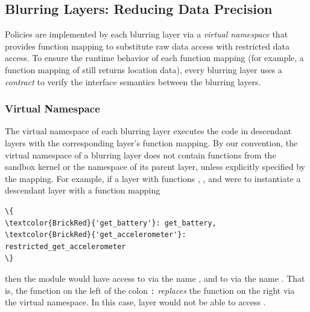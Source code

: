 
\subsection{Blurring Layers: Reducing Data Precision}\label{sec-layer}



Policies are implemented by each blurring layer via a \textit{virtual 
namespace} that provides function mapping to substitute raw 
data access with restricted data access. 
To ensure the runtime behavior of each function mapping (for example, 
a function mapping of  still returns location data), 
every blurring layer uses a \textit{contract} to verify the interface 
semantics between the blurring layers.

\subsubsection{Virtual Namespace}

The virtual namespace of each blurring layer executes the code in descendant 
layers with the corresponding layer's function mapping. By our convention, 
the virtual namespace of a blurring layer does not contain functions from the 
sandbox kernel or the namespace of its parent layer, unless explicitly 
specified by the mapping. 
For example, if a layer  with 
functions , , and 
 were to instantiate a descendant 
layer  with a function mapping 

\begin{Verbatim}
\{
\textcolor{BrickRed}{'get_battery'}: get_battery, 
\textcolor{BrickRed}{'get_accelerometer'}: restricted_get_accelerometer
\}
\end{Verbatim}
then the module  would have access
to  via the name , and to
 via the name 
. That is, the function on the left of the colon \texttt{:}
\textit{replaces} the function on the right via the virtual namespace. 
In this case, layer  would not be able to access 
.

